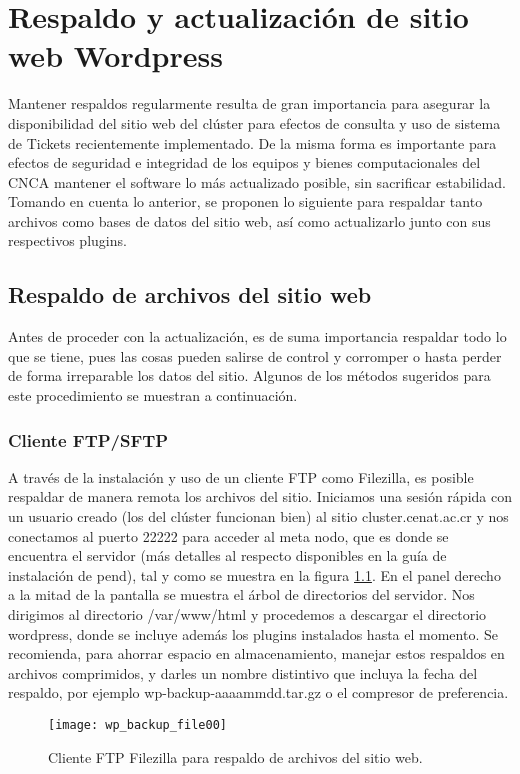 \chapter{Respaldo y actualización de sitio web Wordpress}
Mantener respaldos regularmente resulta de gran importancia para asegurar la disponibilidad del sitio web del clúster para efectos de consulta y uso de sistema de Tickets recientemente implementado. De la misma forma es importante para efectos de seguridad e integridad de los equipos y bienes computacionales del CNCA mantener el software lo más actualizado posible,  sin sacrificar estabilidad. Tomando en cuenta lo anterior, se proponen lo siguiente para respaldar tanto archivos como bases de datos del sitio web, así como actualizarlo junto con sus respectivos plugins.

\section{Respaldo de archivos del sitio web}
Antes de proceder con la actualización, es de suma importancia respaldar todo lo que se tiene, pues las cosas pueden salirse de control y corromper o hasta perder de forma irreparable los datos del sitio. Algunos de los métodos sugeridos para este procedimiento se muestran a continuación.

\subsection{Cliente FTP/SFTP}
A través de la instalación y uso de un cliente FTP como Filezilla, es posible respaldar de manera remota los archivos del sitio. Iniciamos una sesión rápida con un usuario creado (los del clúster funcionan bien) al sitio cluster.cenat.ac.cr y nos conectamos al puerto 22222 para acceder al meta nodo, que es donde se encuentra el servidor (más detalles al respecto disponibles en la guía de instalación de pend), tal y como se muestra en la figura \ref{fig:wp_backup_file00}. En el panel derecho a la mitad de la pantalla se muestra el árbol de directorios del servidor. Nos dirigimos al directorio /var/www/html y procedemos a descargar el directorio wordpress, donde se incluye además los plugins instalados hasta el momento. Se recomienda, para ahorrar espacio en almacenamiento, manejar estos respaldos en archivos comprimidos, y darles un nombre distintivo que incluya la fecha del respaldo, por ejemplo wp-backup-aaaammdd.tar.gz o el compresor de preferencia.

\begin{figure}[H]
\centering
\texttt{[image: wp\_backup\_file00]}
\caption{Cliente FTP Filezilla para respaldo de archivos del sitio web.}
\label{fig:wp_backup_file00}
\end{figure}

